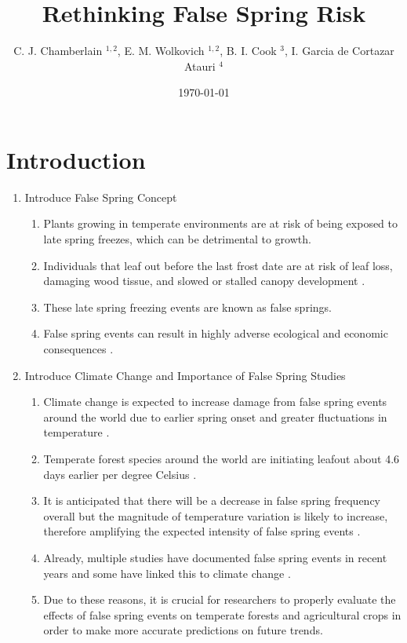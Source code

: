 \documentclass{article}\usepackage[]{graphicx}\usepackage[]{color}
\begin{document}
\title{Rethinking False Spring Risk}
\author{C. J. Chamberlain $^{1,2}$, E. M. Wolkovich $^{1,2}$, B. I. Cook $^{3}$, I. Garcia de Cortazar Atauri $^{4}$}
\date{\today}
\maketitle 
 

\renewcommand{\thetable}{\arabic{table}}
\renewcommand{\thefigure}{\arabic{figure}}
\renewcommand{\labelitemi}{$-$}

\section*{Introduction}
\begin{enumerate}
\item Introduce False Spring Concept
\begin {enumerate}
\item Plants growing in temperate environments are at risk of being exposed to late spring freezes, which can be detrimental to growth. 
\item Individuals that leaf out before the last frost date are at risk of leaf loss, damaging wood tissue, and slowed or stalled canopy development \citep{Gu2008, Hufkens2012}. 
\item These late spring freezing events are known as false springs. 
\item False spring events can result in highly adverse ecological and economic consequences \citep{Knudson2012, Ault2013}.
\end{enumerate}
\item Introduce Climate Change and Importance of False Spring Studies
\begin{enumerate}
\item Climate change is expected to increase damage from false spring events around the world due to earlier spring onset and greater fluctuations in temperature \citep{Cannell1986, Inouye2008, Martin2010}. 
\item Temperate forest species around the world are initiating leafout about 4.6 days earlier per degree Celsius \citep{Wolkovich2012, Polgar2014}. 
\item It is anticipated that there will be a decrease in false spring frequency overall but the magnitude of temperature variation is likely to increase, therefore amplifying the expected intensity of false spring events \citep{Kodra2011, Allstadt2015}. 
\item Already, multiple studies have documented false spring events in recent years \citep{Gu2008, Augspurger2009, Knudson2012, Augspurger2013} and some have linked this to climate change \citep{Ault2013, Allstadt2015, Muffler2016, Xin2016}. 
\item Due to these reasons, it is crucial for researchers to properly evaluate the effects of false spring events on temperate forests and agricultural crops in order to make more accurate predictions on future trends.
\end{enumerate}


\end{enumerate}
\end{document}
